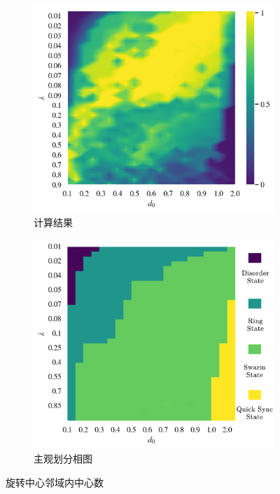 \documentclass{article}
\begin{document}
\vspace{-0.5cm}
\begin{figure}[H]
	\centering
	\begin{subfigure}[b]{0.49\textwidth}
		\includegraphics[width=\textwidth]{./figs/nearbyNums.png}
		\vspace{-1cm}
		\caption{计算结果}
		
	\end{subfigure}
	\begin{subfigure}[b]{0.49\textwidth}
		\includegraphics[width=\textwidth]{./figs/subjectiveOp2.png}
		\vspace{-1cm}
		\caption{主观划分相图}
	\end{subfigure}
	\vspace{-0.5cm}
	\caption{旋转中心邻域内中心数}
	\label{fig:fig234c.7.1}
\end{figure}
\end{document}
